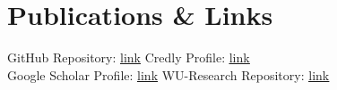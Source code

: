 \documentclass[a4paper]{twentysecondcv} %
\begin{document}




\section{Publications \& Links}

GitHub Repository: \href{https://github.com/CourtVision/}{\underline{link}} \hspace{1cm} Credly Profile: \href{https://www.credly.com/users/daniel-bekesi.9b2b92f6/badges}{\underline{link}} \\
Google Scholar Profile: \href{https://scholar.google.com/citations?user=tQGuPUEAAAAJ&hl=en}{\underline{link}} \hspace{0.45cm}  WU-Research Repository: \href{https://research.wu.ac.at/de/searchAll/index/?search=Bekesi&pageSize=25&showAdvanced=false&allConcepts=true&inferConcepts=true&searchBy=PartOfNameOrTitle}{\underline{link}} 



\end{document}
